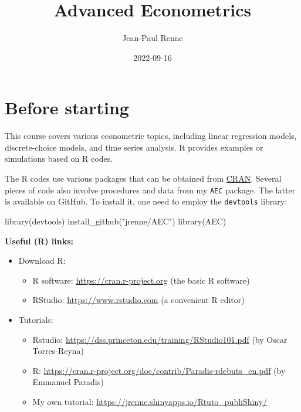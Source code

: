 \documentclass[
]{book}
\title{Advanced Econometrics}
\author{Jean-Paul Renne}
\date{2022-09-16}
\newenvironment{Shaded}{\begin{snugshade}}{\end{snugshade}}
\newcommand{\FunctionTok}[1]{\textcolor[rgb]{0.00,0.00,0.00}{#1}}
\newcommand{\NormalTok}[1]{#1}
\newcommand{\StringTok}[1]{\textcolor[rgb]{0.31,0.60,0.02}{#1}}
\providecommand{\tightlist}{%
  \setlength{\itemsep}{0pt}\setlength{\parskip}{0pt}}
\theoremstyle{definition}
\theoremstyle{definition}
\theoremstyle{definition}
\theoremstyle{definition}
\theoremstyle{remark}
\begin{document}
\maketitle

{
\setcounter{tocdepth}{1}
\tableofcontents
}
\newcommand{\bv}[1]{\mathbf{#1}}

\hypertarget{intro}{%
\chapter{Before starting}\label{intro}}

This course covers various econometric topics, including linear regression models, discrete-choice models, and time series analysis. It provides examples or simulations based on R codes.

The R codes use various packages that can be obtained from \href{https://cran.r-project.org}{CRAN}. Several pieces of code also involve procedures and data from my \texttt{AEC} package. The latter is available on GitHub. To install it, one need to employ the \texttt{devtools} library:

\begin{Shaded}
\begin{Highlighting}[]
\FunctionTok{library}\NormalTok{(devtools)}
\FunctionTok{install\_github}\NormalTok{(}\StringTok{"jrenne/AEC"}\NormalTok{)}
\FunctionTok{library}\NormalTok{(AEC)}
\end{Highlighting}
\end{Shaded}

\textbf{Useful (R) links:}

\begin{itemize}
\item
  Download R:

  \begin{itemize}
  \tightlist
  \item
    R software: \url{https://cran.r-project.org} (the basic R software)
  \item
    RStudio: \url{https://www.rstudio.com} (a convenient R editor)
  \end{itemize}
\item
  Tutorials:

  \begin{itemize}
  \tightlist
  \item
    Rstudio: \url{https://dss.princeton.edu/training/RStudio101.pdf} (by Oscar Torres-Reyna)
  \item
    R: \url{https://cran.r-project.org/doc/contrib/Paradis-rdebuts_en.pdf} (by Emmanuel Paradis)
  \item
    My own tutorial: \url{https://jrenne.shinyapps.io/Rtuto_publiShiny/}
  \end{itemize}
\end{itemize}
\end{document}
